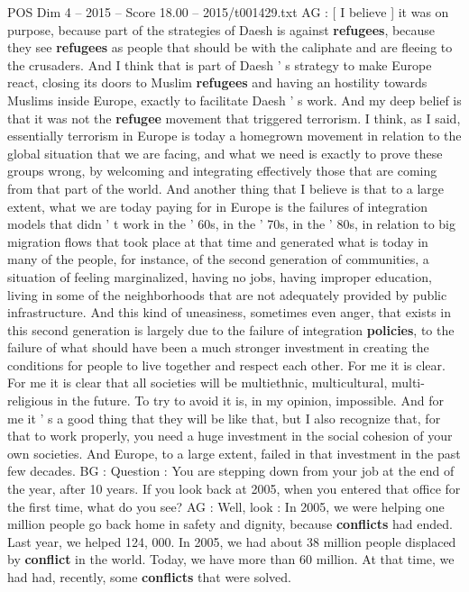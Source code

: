 \begin{textsample}{POS Dim 4 – 2015 – Score 18.00 – 2015/t001429.txt}
AG : [ I believe ] it was on purpose, because part of the strategies of Daesh is against \textbf{refugees}, because they see \textbf{refugees} as people that should be with the caliphate and are fleeing to the crusaders.
And I think that is part of Daesh ' s strategy to make Europe react, closing its doors to Muslim \textbf{refugees} and having an hostility towards Muslims inside Europe, exactly to facilitate Daesh ' s work.
And my deep belief is that it was not the \textbf{refugee} movement that triggered terrorism.
I think, as I said, essentially terrorism in Europe is today a homegrown movement in relation to the global situation that we are facing, and what we need is exactly to prove these groups wrong, by welcoming and integrating effectively those that are coming from that part of the world.
And another thing that I believe is that to a large extent, what we are today paying for in Europe is the failures of integration models that didn ' t work in the ' 60s, in the ' 70s, in the ' 80s, in relation to big migration flows that took place at that time and generated what is today in many of the people, for instance, of the second generation of communities, a situation of feeling marginalized, having no jobs, having improper education, living in some of the neighborhoods that are not adequately provided by public infrastructure.
And this kind of uneasiness, sometimes even anger, that exists in this second generation is largely due to the failure of integration \textbf{policies}, to the failure of what should have been a much stronger investment in creating the conditions for people to live together and respect each other.
For me it is clear.
For me it is clear that all societies will be multiethnic, multicultural, multi-religious in the future.
To try to avoid it is, in my opinion, impossible.
And for me it ' s a good thing that they will be like that, but I also recognize that, for that to work properly, you need a huge investment in the social cohesion of your own societies.
And Europe, to a large extent, failed in that investment in the past few decades.
BG : Question : You are stepping down from your job at the end of the year, after 10 years.
If you look back at 2005, when you entered that office for the first time, what do you see?
AG : Well, look : In 2005, we were helping one million people go back home in safety and dignity, because \textbf{conflicts} had ended.
Last year, we helped 124, 000.
In 2005, we had about 38 million people displaced by \textbf{conflict} in the world.
Today, we have more than 60 million.
At that time, we had had, recently, some \textbf{conflicts} that were solved.

\end{textsample}

